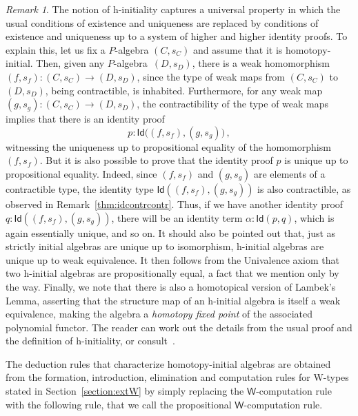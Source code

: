 \documentclass{article}
\newcommand{\Id}{\mathsf{Id}}
\newcommand{\W}{\mathsf{W}}
\theoremstyle{remark}
\newtheorem{remark}[theorem]{Remark}
\theoremstyle{definition}
\begin{document}
\begin{remark} 
The notion of h-initiality captures a universal property in which the usual conditions of existence and uniqueness  are replaced by conditions of existence and uniqueness up to a system of higher and higher identity proofs. To explain this, let us fix a $P$-algebra  $(C,s_C)$ and assume that it is homotopy-initial. Then, given any 
$P$-algebra~$(D,s_D)$, there is a weak homomorphism $(f,s_f) : (C,s_C) \rightarrow (D,s_D)$, since
the type of weak maps from $(C,s_C)$ to $(D,s_D)$, being contractible, is inhabited. Furthermore, for any weak map $(g,s_g) : (C,s_C) \rightarrow (D,s_D)$, the
contractibility of the type of weak maps  implies that there is an identity proof 
\[
 p  : \Id\big( (f,s_f), (g, s_g) \big) \, , 
\]
witnessing the uniqueness up to propositional equality of the homomorphism $(f,s_f)$. But it
is also possible to prove that the identity proof $p$ is unique up to propositional equality. Indeed, since 
$(f,s_f)$ and $(g,s_g)$ are elements of a contractible type, the identity type $\Id( (f,s_f), (g, s_g) )$ 
is also contractible, as observed in Remark~\ref{thm:idcontrcontr}. Thus, if we have another 
identity proof $q : \Id( (f,s_f), (g, s_g) )$, there will be an identity term $\alpha : \Id(p,q)$, which is again
essentially unique, and so on.  It should also be pointed out that, just as strictly initial algebras are unique
up to isomorphism, h-initial algebras are unique up to weak equivalence. It then follows from
the Univalence axiom that two h-initial algebras are propositionally equal, a fact that we mention only by the way. Finally, we note that there is also a homotopical version of Lambek's Lemma, asserting that the structure map of an h-initial algebra is itself a weak equivalence, making the algebra a \emph{homotopy fixed point} of the associated polynomial functor. The reader can work out the details from the usual proof and the definition of  h-initiality, or consult~\cite{AwodeyS:indtht}.
\end{remark}

\medskip

The deduction rules that characterize homotopy-initial algebras are
obtained from the formation, introduction, elimination and computation rules for W-types 
stated in Section~\ref{section:extW} by simply replacing the $\W$-computation rule with the
following rule, that we call the propositional $\W$-computation rule.

\smallskip
\end{document}
